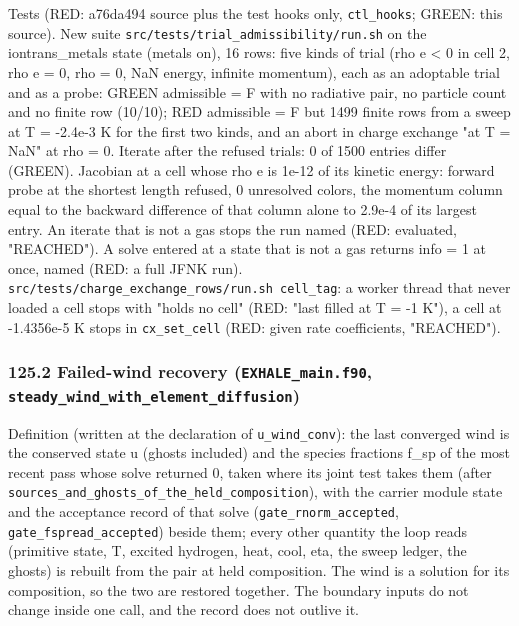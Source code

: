 \documentclass[english,a4paper]{my_memo}
\begin{document}
Tests (RED: a76da494 source plus the test hooks only, \texttt{ctl\_hooks}; GREEN: this source). New suite \texttt{src/tests/trial\_admissibility/run.sh} on the iontrans\_metals state (metals on), 16 rows: five kinds of trial (rho e \textless{} 0 in cell 2, rho e = 0, rho = 0, NaN energy, infinite momentum), each as an adoptable trial and as a probe: GREEN admissible = F with no radiative pair, no particle count and no finite row (10/10); RED admissible = F but 1499 finite rows from a sweep at T = -2.4e-3 K for the first two kinds, and an abort in charge exchange "at T = NaN" at rho = 0. Iterate after the refused trials: 0 of 1500 entries differ (GREEN). Jacobian at a cell whose rho e is 1e-12 of its kinetic energy: forward probe at the shortest length refused, 0 unresolved colors, the momentum column equal to the backward difference of that column alone to 2.9e-4 of its largest entry. An iterate that is not a gas stops the run named (RED: evaluated, "REACHED"). A solve entered at a state that is not a gas returns info = 1 at once, named (RED: a full JFNK run). \texttt{src/tests/charge\_exchange\_rows/run.sh\ cell\_tag}: a worker thread that never loaded a cell stops with "holds no cell" (RED: "last filled at T = -1 K"), a cell at -1.4356e-5 K stops in \texttt{cx\_set\_cell} (RED: given rate coefficients, "REACHED").

\subsubsection{\texorpdfstring{125.2 Failed-wind recovery (\texttt{EXHALE\_main.f90}, \texttt{steady\_wind\_with\_element\_diffusion})}{125.2 Failed-wind recovery (EXHALE\_main.f90, steady\_wind\_with\_element\_diffusion)}}\label{1252-failed-wind-recovery-exhale_mainf90-steady_wind_with_element_diffusion}

Definition (written at the declaration of \texttt{u\_wind\_conv}): the last converged wind is the conserved state u (ghosts included) and the species fractions f\_sp of the most recent pass whose solve returned 0, taken where its joint test takes them (after \texttt{sources\_and\_ghosts\_of\_the\_held\_composition}), with the carrier module state and the acceptance record of that solve (\texttt{gate\_rnorm\_accepted}, \texttt{gate\_fspread\_accepted}) beside them; every other quantity the loop reads (primitive state, T, excited hydrogen, heat, cool, eta, the sweep ledger, the ghosts) is rebuilt from the pair at held composition. The wind is a solution for its composition, so the two are restored together. The boundary inputs do not change inside one call, and the record does not outlive it.
\end{document}

